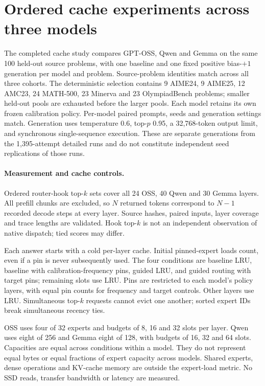 \section{Ordered cache experiments across three models}
\label{sec:multimodel-cache-100}
\label{sec:oss-cache-100}

The completed cache study compares GPT-OSS, Qwen and Gemma on the same
100 held-out source problems, with one baseline and one fixed positive
bias-$+1$ generation per model and problem. Source-problem identities
match across all three cohorts. The deterministic selection contains
9 AIME24, 9 AIME25, 12 AMC23, 24 MATH-500, 23 Minerva and 23 OlympiadBench
problems; smaller held-out pools are exhausted before the larger pools.
Each model retains its own frozen calibration policy. Per-model paired
prompts, seeds and generation settings match. Generation uses temperature
0.6, top-$p$ 0.95, a 32,768-token output limit, and synchronous
single-sequence execution. These are separate generations from the
1,395-attempt detailed runs and do not constitute independent seed
replications of those runs.

\paragraph{Measurement and cache controls.}
Ordered router-hook top-$k$ sets cover all 24 OSS, 40 Qwen and 30 Gemma
layers. All prefill chunks are excluded, so $N$ returned tokens correspond
to $N-1$ recorded decode steps at every layer. Source hashes, paired inputs,
layer coverage and trace lengths are validated. Hook top-$k$ is not an
independent observation of native dispatch; tied scores may differ.

Each answer starts with a cold per-layer cache. Initial pinned-expert loads
count, even if a pin is never subsequently used. The four conditions are
baseline LRU, baseline with calibration-frequency pins, guided LRU, and
guided routing with target pins; remaining slots use LRU. Pins are restricted
to each model's policy layers, with equal pin counts for frequency and target
controls. Other layers use LRU. Simultaneous top-$k$ requests cannot evict
one another; sorted expert IDs break simultaneous recency ties.

OSS uses four of 32 experts and budgets of 8, 16 and 32 slots per layer.
Qwen uses eight of 256 and Gemma eight of 128, with budgets of 16, 32 and
64 slots. Capacities are equal across conditions within a model. They do
not represent equal bytes or equal fractions of expert capacity across
models. Shared experts, dense operations and KV-cache memory are outside
the expert-load metric. No SSD reads, transfer bandwidth or latency are measured.

